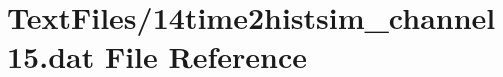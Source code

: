 \hypertarget{14time2histsim__channel15_8dat}{}\section{Text\+Files/14time2histsim\+\_\+channel15.dat File Reference}
\label{14time2histsim__channel15_8dat}
